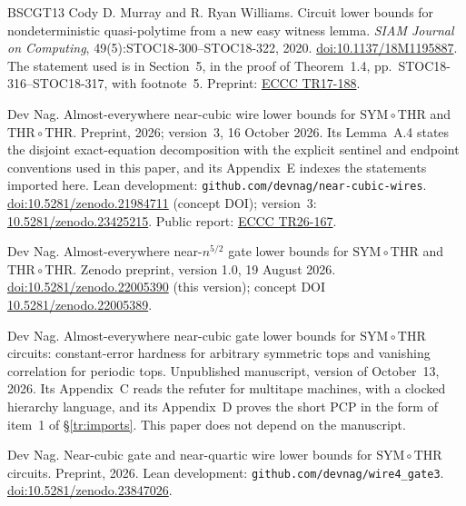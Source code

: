 \documentclass[11pt,letterpaper]{article}
\theoremstyle{definition}
\theoremstyle{remark}
\begin{document}
\begin{thebibliography}{BSCGT13}
Cody D. Murray and R. Ryan Williams.
\newblock Circuit lower bounds for nondeterministic quasi-polytime from
  a new easy witness lemma.
\newblock \emph{SIAM Journal on Computing}, 49(5):STOC18-300--STOC18-322,
  2020.
\newblock \href{https://doi.org/10.1137/18M1195887}{doi:10.1137/18M1195887}.
The statement used is in Section~5, in the proof of Theorem~1.4,
pp.~STOC18-316--STOC18-317, with footnote~5. Preprint:
\href{https://eccc.weizmann.ac.il/report/2017/188/}{ECCC TR17-188}.

Dev Nag.
\newblock Almost-everywhere near-cubic wire lower bounds for
$\mathrm{SYM}\circ\mathrm{THR}$ and $\mathrm{THR}\circ\mathrm{THR}$.
\newblock Preprint, 2026; version~3, 16 October 2026. Its Lemma~A.4
states the disjoint exact-equation decomposition with the explicit
sentinel and endpoint conventions used in this paper, and its
Appendix~E indexes the statements imported here. Lean development:
\nolinkurl{github.com/devnag/near-cubic-wires}.
\newblock \href{https://doi.org/10.5281/zenodo.21984711}{doi:10.5281/zenodo.21984711}
(concept DOI); version~3:
\href{https://doi.org/10.5281/zenodo.23425215}{10.5281/zenodo.23425215}.
Public report: \href{https://eccc.weizmann.ac.il/report/2026/167/}{ECCC TR26-167}.

Dev Nag.
\newblock Almost-everywhere near-$n^{5/2}$ gate lower bounds for
$\mathrm{SYM}\circ\mathrm{THR}$ and $\mathrm{THR}\circ\mathrm{THR}$.
\newblock Zenodo preprint, version 1.0, 19 August 2026.
\newblock \href{https://doi.org/10.5281/zenodo.22005390}{doi:10.5281/zenodo.22005390}
(this version); concept DOI
\href{https://doi.org/10.5281/zenodo.22005389}{10.5281/zenodo.22005389}.

Dev Nag.
\newblock Almost-everywhere near-cubic gate lower bounds for
$\mathrm{SYM}\circ\mathrm{THR}$ circuits: constant-error hardness for
arbitrary symmetric tops and vanishing correlation for periodic tops.
\newblock Unpublished manuscript, version of October~13, 2026. Its
Appendix~C reads the refuter for multitape machines, with a clocked
hierarchy language, and its Appendix~D proves the short PCP in the form
of item~1 of \S\ref{tr:imports}. This paper does not depend on the
manuscript.

Dev Nag.
\newblock Near-cubic gate and near-quartic wire lower bounds for
$\mathrm{SYM}\circ\mathrm{THR}$ circuits.
\newblock Preprint, 2026. Lean development:
\nolinkurl{github.com/devnag/wire4_gate3}.
\newblock \href{https://doi.org/10.5281/zenodo.23847026}{doi:10.5281/zenodo.23847026}.


\end{thebibliography}
\end{document}
